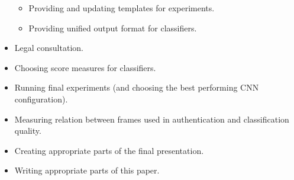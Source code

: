 \begin{itemize}
\begin{itemize}
                \item Providing and updating templates for experiments.
                \item Providing unified output format for classifiers.
            \end{itemize}
            \item Legal consultation.
            \item Choosing score measures for classifiers.
            \item Running final experiments (and choosing the best performing CNN configuration).
            \item Measuring relation between frames used in authentication and
                  classification quality.
            \item Creating appropriate parts of the final presentation.
            \item Writing appropriate parts of this paper.
        \end{itemize}

